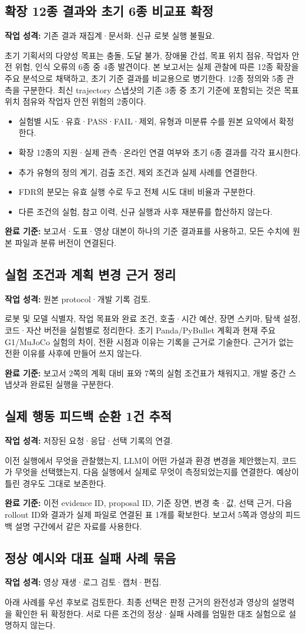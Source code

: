 \documentclass[a4paper,11pt]{article}
\newcommand{\task}[3]{\subsection{#1}\textbf{작업 성격:} #2\par #3}
\begin{document}
\task{확장 12종 결과와 초기 6종 비교표 확정}{기존 결과 재집계·문서화. 신규 로봇 실행 불필요.}{
초기 기획서의 다양성 목표는 충돌, 도달 불가, 장애물 간섭, 목표 위치 점유,
작업자 안전 위험, 인식 오류의 6종 중 4종 발견이다. 본 보고서는 실제 관찰에
따른 12종 확장을 주요 분석으로 채택하고, 초기 기준 결과를 비교용으로 병기한다.
12종 정의와 5종 관측을 구분한다. 최신 trajectory 스냅샷의 기존 3종 중 초기 기준에
포함되는 것은 목표 위치 점유와 작업자 안전 위험의 2종이다.}

\begin{itemize}
\item 실험별 시도·유효·PASS·FAIL·제외, 유형과 미분류 수를 원본 요약에서 확정한다.
\item 확장 12종의 지원·실제 관측·온라인 연결 여부와 초기 6종 결과를 각각 표시한다.
\item 추가 유형의 정의 계기, 검출 조건, 제외 조건과 실제 사례를 연결한다.
\item FDR의 분모는 유효 실행 수로 두고 전체 시도 대비 비율과 구분한다.
\item 다른 조건의 실험, 참고 이력, 신규 실행과 사후 재분류를 합산하지 않는다.
\end{itemize}
\textbf{완료 기준:} 보고서·도표·영상 대본이 하나의 기준 결과표를 사용하고,
모든 수치에 원본 파일과 분류 버전이 연결된다.

\task{실험 조건과 계획 변경 근거 정리}{원본 protocol·개발 기록 검토.}{
로봇 및 모델 식별자, 작업 목표와 완료 조건, 호출·시간 예산, 장면 스키마,
탐색 설정, 코드·자산 버전을 실험별로 정리한다. 초기 Panda/PyBullet 계획과
현재 주요 G1/MuJoCo 실험의 차이, 전환 시점과 이유는 기록을 근거로 기술한다.
근거가 없는 전환 이유를 사후에 만들어 쓰지 않는다.}

\textbf{완료 기준:} 보고서 2쪽의 계획 대비 표와 7쪽의 실험 조건표가 채워지고,
개발 중간 스냅샷과 완료된 실행을 구분한다.

\task{실제 행동 피드백 순환 1건 추적}{저장된 요청·응답·선택 기록의 연결.}{
이전 실행에서 무엇을 관찰했는지, LLM이 어떤 가설과 환경 변경을 제안했는지,
코드가 무엇을 선택했는지, 다음 실행에서 실제로 무엇이 측정되었는지를 연결한다.
예상이 틀린 경우도 그대로 보존한다.}

\textbf{완료 기준:} 이전 evidence ID, proposal ID, 기준 장면, 변경 축·값,
선택 근거, 다음 rollout ID와 결과가 실제 파일로 연결된 표 1개를 확보한다.
보고서 5쪽과 영상의 피드백 설명 구간에서 같은 자료를 사용한다.

\task{정상 예시와 대표 실패 사례 묶음}{영상 재생·로그 검토·캡처·편집.}{
아래 사례를 우선 후보로 검토한다. 최종 선택은 판정 근거의 완전성과 영상의
설명력을 확인한 뒤 확정한다. 서로 다른 조건의 정상·실패 사례를 엄밀한 대조
실험으로 설명하지 않는다.}
\end{document}
